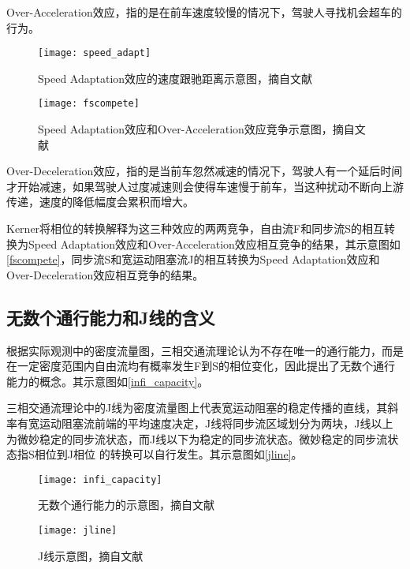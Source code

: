 Over-Acceleration效应，指的是在前车速度较慢的情况下，驾驶人寻找机会超车的行为。

\begin{figure}[htbp]
\begin{minipage}[t]{0.48\linewidth}
\centering
\texttt{[image: speed\_adapt]}
\caption{Speed Adaptation效应的速度跟驰距离示意图，摘自文献\citet{S.Kerner2009}}
\label{speed_adapt}
\end{minipage}%
\hspace*{0.04\linewidth}
\begin{minipage}[t]{0.48\linewidth}
\centering
\texttt{[image: fscompete]}
\caption{Speed Adaptation效应和Over-Acceleration效应竞争示意图，摘自文献\citet{S.Kerner2009}}
\label{fscompete}
\end{minipage}
\end{figure}

Over-Deceleration效应，指的是当前车忽然减速的情况下，驾驶人有一个延后时间才开始减速，如果驾驶人过度减速则会使得车速慢于前车，当这种扰动不断向上游传递，速度的降低幅度会累积而增大。

Kerner将相位的转换解释为这三种效应的两两竞争，自由流F和同步流S的相互转换为Speed Adaptation效应和Over-Acceleration效应相互竞争的结果，其示意图如\autoref{fscompete}，同步流S和宽运动阻塞流J的相互转换为Speed Adaptation效应和Over-Deceleration效应相互竞争的结果。

\subsection{无数个通行能力和J线的含义}

根据实际观测中的密度流量图，三相交通流理论认为不存在唯一的通行能力，而是在一定密度范围内自由流均有概率发生F到S的相位变化，因此提出了无数个通行能力的概念。其示意图如\autoref{infi_capacity}。

三相交通流理论中的J线为密度流量图上代表宽运动阻塞的稳定传播的直线，其斜率有宽运动阻塞流前端的平均速度决定，J线将同步流区域划分为两块，J线以上为微妙稳定的同步流状态，而J线以下为稳定的同步流状态。微妙稳定的同步流状态指S相位到J相位 的转换可以自行发生。其示意图如\autoref{jline}。

\begin{figure}[htbp]
\begin{minipage}[t]{0.48\linewidth}
\centering
\texttt{[image: infi\_capacity]}
\caption{无数个通行能力的示意图，摘自文献\citet{S.Kerner2009}}
\label{infi_capacity}
\end{minipage}%
\hspace*{0.04\linewidth}
\begin{minipage}[t]{0.48\linewidth}
\centering
\texttt{[image: jline]}
\caption{J线示意图，摘自文献\citet{S.Kerner2009}}
\label{jline}
\end{minipage}
\end{figure}


